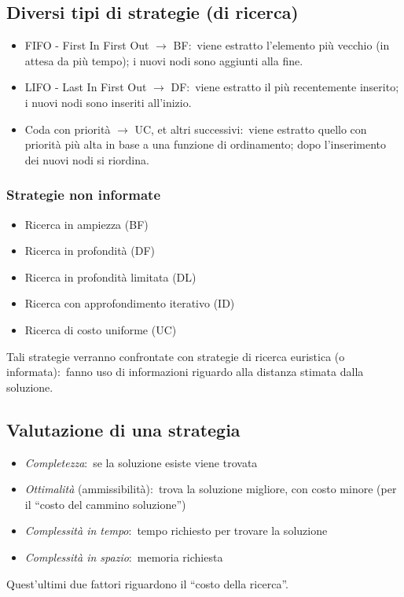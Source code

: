 \subsection{Diversi tipi di strategie (di ricerca)}

\begin{itemize}
	\item FIFO - First In First Out $\rightarrow$ BF:\ viene estratto l'elemento più vecchio (in attesa da più tempo); i nuovi nodi sono aggiunti alla fine.
	\item LIFO - Last In First Out $\rightarrow$ DF:\ viene estratto il più recentemente inserito; i nuovi nodi sono inseriti all'inizio.
	\item Coda con priorità $\rightarrow$ UC, et altri successivi:\ viene estratto quello con priorità più alta in base a una funzione di ordinamento; dopo l'inserimento dei nuovi nodi si riordina.
\end{itemize}

\subsubsection{Strategie non informate}
\begin{itemize}
	\item Ricerca in ampiezza (BF)
	\item Ricerca in profondità (DF)
	\item Ricerca in profondità limitata (DL)
	\item Ricerca con approfondimento iterativo (ID)
	\item Ricerca di costo uniforme (UC)
\end{itemize}
Tali strategie verranno confrontate con strategie di ricerca euristica (o informata):\ fanno uso di informazioni riguardo alla distanza stimata dalla soluzione.

\subsection{Valutazione di una strategia}

\begin{itemize}
	\item \textit{Completezza}:\ se la soluzione esiste viene trovata
	\item \textit{Ottimalità} (ammissibilità):\ trova la soluzione migliore, con costo minore (per il ``costo del cammino soluzione'')
	\item \textit{Complessità in tempo}:\ tempo richiesto per trovare la soluzione
	\item \textit{Complessità in spazio}:\ memoria richiesta
\end{itemize}
Quest'ultimi due fattori riguardono il ``costo della ricerca''.

